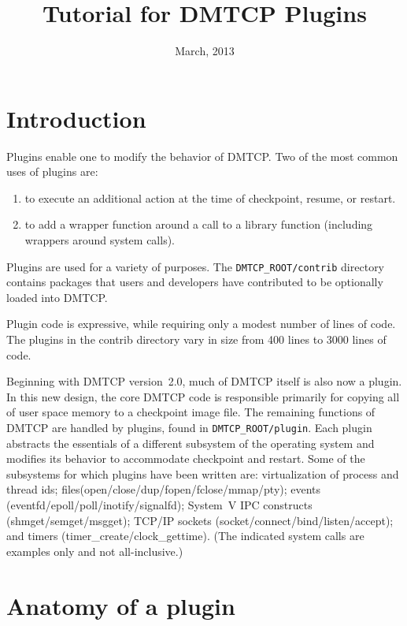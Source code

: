 \documentclass{article}
\title{Tutorial for DMTCP Plugins}
\author{}
\date{March, 2013}
\begin{document}
\maketitle
\tableofcontents

\section{Introduction}

Plugins enable one to modify the behavior of DMTCP.  Two of the most
common uses of plugins are:
\begin{enumerate}
\item to execute an additional action at the time of checkpoint, resume,
	or restart.
\item to add a wrapper function around a call to a library function (including
	wrappers around system calls).
\end{enumerate}

Plugins are used for a variety of purposes. The {\tt DMTCP\_ROOT/contrib}
directory contains packages that users and developers have contributed
to be optionally loaded into DMTCP.



Plugin code is expressive, while requiring only a modest number of lines
of code.  The plugins in the contrib directory vary in size from
400 lines to 3000 lines of code.

Beginning with DMTCP version~2.0, much of DMTCP itself is also now
a plugin.  In this new design, the core DMTCP code is responsible
primarily for copying all of user space memory to a checkpoint
image file.  The remaining functions of DMTCP are handled by plugins,
found in {\tt DMTCP\_ROOT/plugin}.  Each plugin abstracts the essentials of a
different subsystem of the operating system and modifies its behavior
to accommodate checkpoint and restart.  Some of the subsystems for
which plugins have been written are: virtualization of process
and thread ids; files(open/close/dup/fopen/fclose/mmap/pty);
events (eventfd/epoll/poll/inotify/signalfd);
System~V IPC constructs (shmget/semget/msgget); TCP/IP
sockets (socket/connect/bind/listen/accept); and timers
(timer\_create/clock\_gettime).  (The indicated system calls are examples
only and not all-inclusive.)

\section{Anatomy of a plugin}
\end{document}
